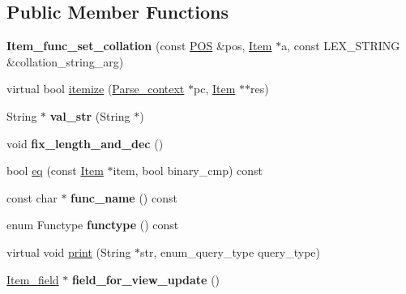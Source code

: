 \subsection*{Public Member Functions}
\begin{DoxyCompactItemize}
\item 
\mbox{\label{classItem__func__set__collation_a7a3a8fadf760b3c0a3dc1e14805f35ef}} 
{\bfseries Item\+\_\+func\+\_\+set\+\_\+collation} (const \mbox{\hyperlink{structYYLTYPE}{P\+OS}} \&pos, \mbox{\hyperlink{classItem}{Item}} $\ast$a, const L\+E\+X\+\_\+\+S\+T\+R\+I\+NG \&collation\+\_\+string\+\_\+arg)
\item 
virtual bool \mbox{\hyperlink{classItem__func__set__collation_afba6fcb692db9783367474887f17f801}{itemize}} (\mbox{\hyperlink{structParse__context}{Parse\+\_\+context}} $\ast$pc, \mbox{\hyperlink{classItem}{Item}} $\ast$$\ast$res)
\item 
\mbox{\label{classItem__func__set__collation_ad77a55843e4f0960f95ed912c4061f84}} 
String $\ast$ {\bfseries val\+\_\+str} (String $\ast$)
\item 
\mbox{\label{classItem__func__set__collation_a28f0ef39d783fcb19a08cdd049da46bf}} 
void {\bfseries fix\+\_\+length\+\_\+and\+\_\+dec} ()
\item 
bool \mbox{\hyperlink{classItem__func__set__collation_acaa06875a0860b9553adb983201e067f}{eq}} (const \mbox{\hyperlink{classItem}{Item}} $\ast$item, bool binary\+\_\+cmp) const
\item 
\mbox{\label{classItem__func__set__collation_aff1feda5f5a2c01ce6e8d253150567b1}} 
const char $\ast$ {\bfseries func\+\_\+name} () const
\item 
\mbox{\label{classItem__func__set__collation_a678dbafe0ea28f1267c78bd9c2f195ee}} 
enum Functype {\bfseries functype} () const
\item 
virtual void \mbox{\hyperlink{classItem__func__set__collation_a9d8a3b08d2d4c55fc9ab038bef3ce1b5}{print}} (String $\ast$str, enum\+\_\+query\+\_\+type query\+\_\+type)
\item 
\mbox{\label{classItem__func__set__collation_a9d6dbd410837a3fcdb0a55f6522aeb8d}} 
\mbox{\hyperlink{classItem__field}{Item\+\_\+field}} $\ast$ {\bfseries field\+\_\+for\+\_\+view\+\_\+update} ()
\end{DoxyCompactItemize}
